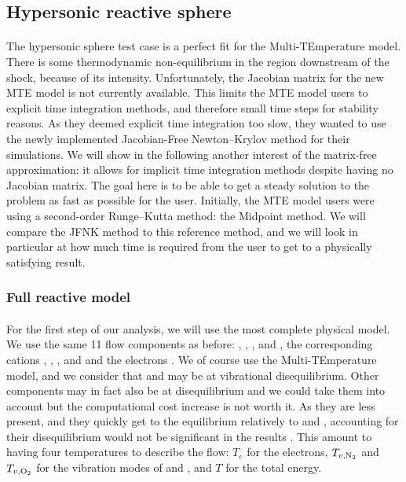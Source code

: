    \subsection{Hypersonic reactive sphere}

      \paragraph{}
      The hypersonic sphere test case is a perfect fit for the Multi-TEmperature model.
      There is some thermodynamic non-equilibrium in the region downstream of the shock, because of its intensity.
      Unfortunately, the Jacobian matrix for the new MTE model is not currently available.
      This limits the MTE model users to explicit time integration methods, and therefore small time steps for stability reasons.
      As they deemed explicit time integration too slow, they wanted to use the newly implemented Jacobian-Free Newton--Krylov method for their simulations.
      We will show in the following another interest of the matrix-free approximation: it allows for implicit time integration methods despite having no Jacobian matrix.
      The goal here is to be able to get a steady solution to the problem as fast as possible for the user.
      Initially, the MTE model users were using a second-order Runge--Kutta method: the Midpoint method.
      We will compare the JFNK method to this reference method, and we will look in particular at how much time is required from the user to get to a physically satisfying result.


      \subsubsection{Full reactive model}

        \paragraph{}
        For the first step of our analysis, we will use the most complete physical model.
        We use the same 11 flow components as before: , , ,  and , the corresponding cations , , ,  and  and the electrons .
        We of course use the Multi-TEmperature model, and we consider that  and  may be at vibrational disequilibrium.
        Other components may in fact also be at disequilibrium and we could take them into account but the computational cost increase is not worth it.
        As they are less present, and they quickly get to the equilibrium relatively to  and , accounting for their disequilibrium would not be significant in the results \cite{Park2006}.
        This amount to having four temperatures to describe the flow: $T_e$ for the electrons, $T_{v, \ce{N_2}}$ and $T_{v, \ce{O_2}}$ for the vibration modes of  and , and $T$ for the total energy.

